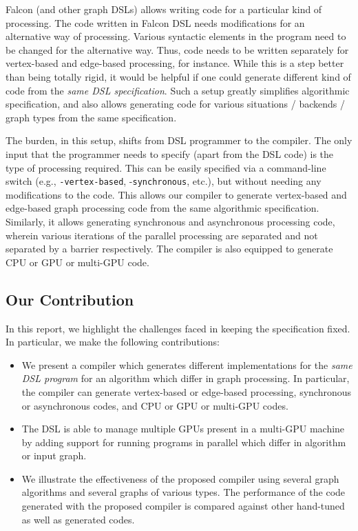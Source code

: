 Falcon (and other graph DSLs) allows writing code for a particular kind of processing. %
The code written in Falcon DSL needs modifications for an alternative way of processing.
Various syntactic elements in the program need to be changed for the alternative way. 
Thus, code needs to be written separately for vertex-based and edge-based processing, for instance.
While this is a step better than being totally rigid, it would be helpful if one could generate different kind of code from the \textit{same DSL specification}.
Such a setup greatly simplifies algorithmic specification, and also allows generating code for various situations / backends / graph types from the same specification.

The burden, in this setup, shifts from DSL programmer to the compiler.
The only input that the programmer needs to specify (apart from the DSL code) is the type of processing required.
This can be easily specified via a command-line switch (e.g., \texttt{-vertex-based}, -\texttt{synchronous}, etc.), but without needing any modifications to the code.
This allows our compiler to generate vertex-based and edge-based graph processing code from the same algorithmic specification.
Similarly, it allows generating synchronous and asynchronous processing code, wherein various iterations of the parallel processing are separated and not separated by a barrier respectively. %
The compiler is also equipped to generate CPU or GPU or multi-GPU code.

\subsection{Our Contribution}
In this report, we highlight the challenges faced in keeping the specification fixed.
In particular, we make the following contributions:
\begin{itemize}
\item We present a compiler which generates different implementations for the \textit{same DSL program} for an algorithm which differ in graph processing. In particular, the compiler can generate vertex-based or edge-based processing, synchronous or asynchronous codes, and CPU or GPU or multi-GPU codes.
\item The DSL is able to manage multiple GPUs present in a multi-GPU machine by adding support for running programs in parallel which differ in algorithm or input graph.
\item We illustrate the effectiveness of the proposed compiler using several graph algorithms and several graphs of various types. The performance of the code generated with the proposed compiler is compared against other hand-tuned as well as generated codes.
\end{itemize}

